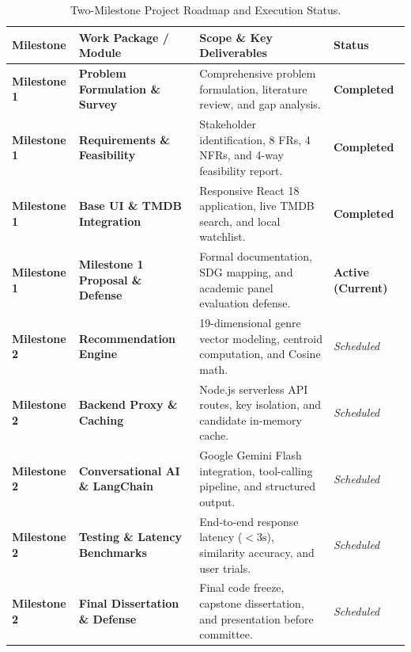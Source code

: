 \documentclass[11pt,a4paper]{article}
\begin{document}
\begin{table}[H]
\centering
\small
\begin{tabularx}{\textwidth}{p{2.2cm} p{4.2cm} X l}
\toprule
\rowcolor{tableheader}
\textbf{Milestone} & \textbf{Work Package / Module} & \textbf{Scope \& Key Deliverables} & \textbf{Status} \\
\midrule
\textbf{Milestone 1} & \textbf{Problem Formulation \& Survey} & Comprehensive problem formulation, literature review, and gap analysis. & \textbf{Completed} \\
\addlinespace
\textbf{Milestone 1} & \textbf{Requirements \& Feasibility} & Stakeholder identification, 8 FRs, 4 NFRs, and 4-way feasibility report. & \textbf{Completed} \\
\addlinespace
\textbf{Milestone 1} & \textbf{Base UI \& TMDB Integration} & Responsive React 18 application, live TMDB search, and local watchlist. & \textbf{Completed} \\
\addlinespace
\textbf{Milestone 1} & \textbf{Milestone 1 Proposal \& Defense} & Formal documentation, SDG mapping, and academic panel evaluation defense. & \textbf{Active (Current)} \\
\midrule
\textbf{Milestone 2} & \textbf{Recommendation Engine} & 19-dimensional genre vector modeling, centroid computation, and Cosine math. & \textit{Scheduled} \\
\addlinespace
\textbf{Milestone 2} & \textbf{Backend Proxy \& Caching} & Node.js serverless API routes, key isolation, and candidate in-memory cache. & \textit{Scheduled} \\
\addlinespace
\textbf{Milestone 2} & \textbf{Conversational AI \& LangChain} & Google Gemini Flash integration, tool-calling pipeline, and structured output. & \textit{Scheduled} \\
\addlinespace
\textbf{Milestone 2} & \textbf{Testing \& Latency Benchmarks} & End-to-end response latency ($< 3\text{s}$), similarity accuracy, and user trials. & \textit{Scheduled} \\
\addlinespace
\textbf{Milestone 2} & \textbf{Final Dissertation \& Defense} & Final code freeze, capstone dissertation, and presentation before committee. & \textit{Scheduled} \\
\bottomrule
\end{tabularx}
\caption{Two-Milestone Project Roadmap and Execution Status.}
\label{tab:roadmap}
\end{table}
\end{document}
